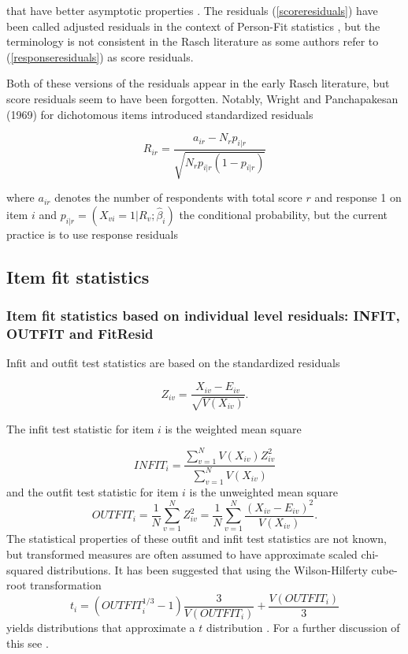 \documentclass{article}
\providecommand\citep{\cite}
\begin{document}
that have better asymptotic properties \cite{Christensen-Kreiner2013}. The residuals (\ref{scoreresiduals}) have been called adjusted residuals in the context of Person-Fit statistics \cite{Dimitrov-Smith2006}, but the terminology is not consistent in the Rasch literature as some authors refer to (\ref{responseresiduals}) as score residuals.

Both of these versions of the residuals appear in the early Rasch literature, but score residuals seem to have been forgotten. Notably, Wright and Panchapakesan (1969) \nocite{Wright_1969} for dichotomous items introduced standardized residuals

\begin{equation}
R_{ir}=\frac{a_{ir}-N_rp_{i|r}}
{\sqrt{N_rp_{i|r}(1-p_{i|r})}}
\end{equation}

where $a_{ir}$ denotes the number of respondents with total score $r$ and response 1 on item $i$ and $p_{i|r}=(X_{vi}=1|R_v;\hat\beta_i)$ the conditional probability, but the current practice is to use response residuals


\subsection{Item fit statistics}


\subsubsection{Item fit statistics based on individual level residuals: INFIT, OUTFIT and FitResid}

Infit and outfit test statistics are based on the standardized residuals

\begin{equation}
Z_{iv}=\frac{X_{iv}-E_{iv}}{\sqrt{V(X_{iv})}}.
\label{standardizedresiduals}
\end{equation}

The infit test statistic for item $i$ is the weighted mean square

\begin{equation}\label{infit}
INFIT_i=\frac{\sum_{v=1}^{N}V(X_{iv})Z_{iv}^2}{\sum_{v=1}^NV(X_{iv})}
\end{equation}
and the outfit test statistic for item $i$ is the unweighted mean square
\begin{equation}\label{outfit}
OUTFIT_i=\frac1N\sum_{v=1}^NZ_{iv}^2=\frac1N\sum_{v=1}^N\frac{(X_{iv}-E_{iv})^2}{V(X_{iv})}.
\end{equation}
The statistical properties of these outfit and infit test statistics are not known, but transformed measures are often assumed to have approximate scaled chi-squared distributions. It has been suggested that using the Wilson-Hilferty cube-root transformation
\begin{equation}\label{wilson-hilferty}
t_i=(OUTFIT_i^{1/3}-1)\frac3{V(OUTFIT_i)}+\frac{V(OUTFIT_i)}3
\end{equation}
yields distributions that approximate a $t$ distribution \citep[Table 5.4a , p.100]{wright-masters}. For a further discussion of this see \cite{Schulz2002}.
\end{document}
